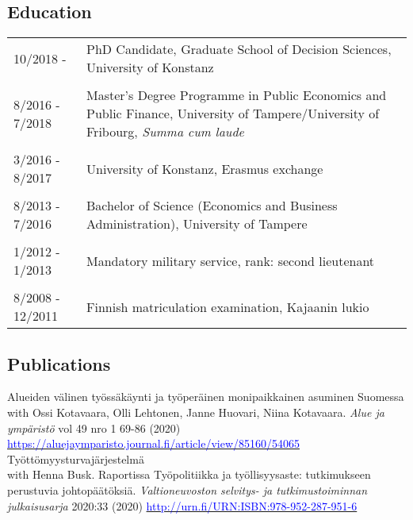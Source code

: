 \documentclass[16pt]{article}
\begin{document}
\subsection*{Education}
\begin{tabular}{@{}p{1.5in}p{5in}}
10/2018 -          & PhD Candidate, Graduate School of Decision Sciences, University of Konstanz \\
                        
\\
8/2016 - 7/2018 & Master's Degree Programme in Public Economics and Public Finance, University of Tampere/University of Fribourg, \textit{Summa cum laude}\\
\\
3/2016 - 8/2017 & University of Konstanz, Erasmus exchange \\
\\
8/2013 - 7/2016 & Bachelor of Science (Economics and Business Administration), University of Tampere\\
\\
1/2012 - 1/2013 & Mandatory military service, rank: second lieutenant\\
\\
8/2008 - 12/2011 & Finnish matriculation examination, Kajaanin lukio
\end{tabular}

\subsection*{Publications}

\noindent Alueiden v\"{a}linen ty\"{o}ss\"{a}k\"{a}ynti ja ty\"{o}per\"{a}inen monipaikkainen asuminen Suomessa \\
\noindent with Ossi Kotavaara, Olli Lehtonen, Janne Huovari, Niina Kotavaara. \textit{Alue ja ympäristö} vol 49 nro 1 69-86 (2020) \href{https://aluejaymparisto.journal.fi/article/view/85160/54065}{\textcolor{blue}{https://aluejaymparisto.journal.fi/article/view/85160/54065}} \\
 
\noindent Ty\"{o}tt\"{o}myysturvaj\"{a}rjestelm\"{a} \\
\noindent with Henna Busk. Raportissa Ty\"{o}politiikka ja ty\"{o}llisyysaste: tutkimukseen perustuvia johtop\"{a}\"{a}t\"{o}ksi\"{a}. \textit{Valtioneuvoston selvitys- ja tutkimustoiminnan julkaisusarja} 2020:33 (2020) \href{http://urn.fi/URN:ISBN:978-952-287-951-6}{\textcolor{blue}{http://urn.fi/URN:ISBN:978-952-287-951-6}} \\
\end{document}
